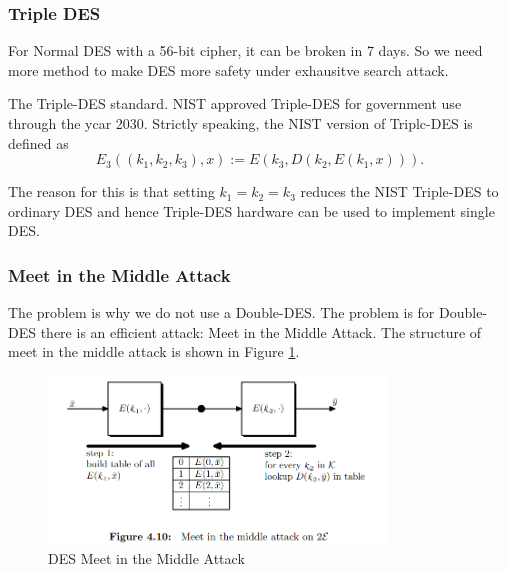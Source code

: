 \subsubsection{Triple DES}

For Normal DES with a 56-bit cipher, it can be broken in 7 days. So we need more method to make DES more safety under exhausitve search attack.

\begin{method} 

    The Triple-DES standard. NIST approved Triple-DES for government use through the ycar 2030. Strictly speaking, the NIST version of Triplc-DES is defined as
    $$
    E_{3}\left(\left(k_{1}, k_{2}, k_{3}\right), x\right):=E\left(k_{3}, D\left(k_{2}, E\left(k_{1}, x\right)\right)\right) .
    $$
    
\end{method}

The reason for this is that setting $k_{1}=k_{2}=k_{3}$ reduces the NIST Triple-DES to ordinary DES and hence Triple-DES hardware can be used to implement single DES.

\subsubsection{Meet in the Middle Attack}

The problem is why we do not use a Double-DES. The problem is for Double-DES there is an efficient attack: Meet in the Middle Attack. The structure of meet in the middle attack is shown in Figure \ref{fig: 03 DES Meet in the Middle Attack}.

\begin{figure}[h]
    \centering
    \includegraphics[width=0.8\textwidth]{Stanford_Crypto_1/fig/03_block_cipher/DES Meet in the Middle Attack.png}
    \caption{DES Meet in the Middle Attack}
    \label{fig: 03 DES Meet in the Middle Attack}
\end{figure}

